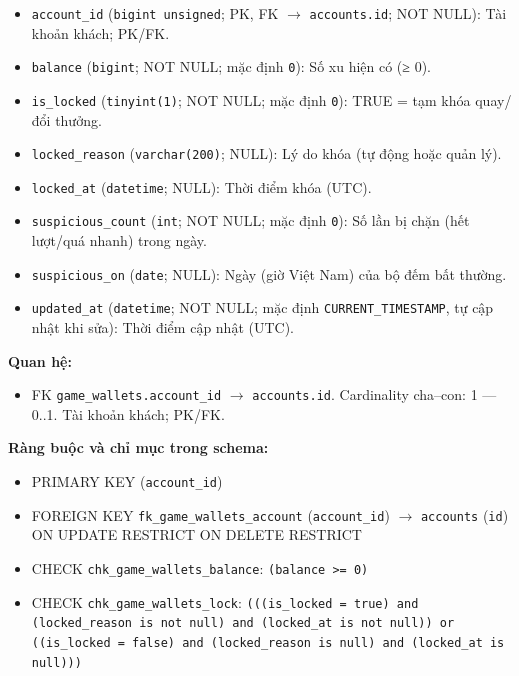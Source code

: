 \begin{itemize}

\item \texttt{account\_id} (\texttt{bigint unsigned}; PK, FK $\rightarrow$ \texttt{accounts.id}; NOT NULL): Tài khoản khách; PK/FK.

\item \texttt{balance} (\texttt{bigint}; NOT NULL; mặc định \texttt{0}): Số xu hiện có (≥ 0).

\item \texttt{is\_locked} (\texttt{tinyint(1)}; NOT NULL; mặc định \texttt{0}): TRUE = tạm khóa quay/đổi thưởng.

\item \texttt{locked\_reason} (\texttt{varchar(200)}; NULL): Lý do khóa (tự động hoặc quản lý).

\item \texttt{locked\_at} (\texttt{datetime}; NULL): Thời điểm khóa (UTC).

\item \texttt{suspicious\_count} (\texttt{int}; NOT NULL; mặc định \texttt{0}): Số lần bị chặn (hết lượt/quá nhanh) trong ngày.

\item \texttt{suspicious\_on} (\texttt{date}; NULL): Ngày (giờ Việt Nam) của bộ đếm bất thường.

\item \texttt{updated\_at} (\texttt{datetime}; NOT NULL; mặc định \texttt{CURRENT\_TIMESTAMP}, tự cập nhật khi sửa): Thời điểm cập nhật (UTC).

\end{itemize}

\textbf{Quan hệ:}

\begin{itemize}

\item FK \texttt{game\_wallets.account\_id} $\rightarrow$ \texttt{accounts.id}. Cardinality cha--con: 1 — 0..1. Tài khoản khách; PK/FK.

\end{itemize}

\textbf{Ràng buộc và chỉ mục trong schema:}

\begin{itemize}

\item PRIMARY KEY (\texttt{account\_id})

\item FOREIGN KEY \texttt{fk\_game\_wallets\_account} (\texttt{account\_id}) $\rightarrow$ \texttt{accounts} (\texttt{id}) ON UPDATE RESTRICT ON DELETE RESTRICT

\item CHECK \texttt{chk\_game\_wallets\_balance}: \texttt{(balance >= 0)}

\item CHECK \texttt{chk\_game\_wallets\_lock}: \texttt{(((is\_locked = true) and (locked\_reason is not null) and (locked\_at is not null)) or ((is\_locked = false) and (locked\_reason is null) and (locked\_at is null)))}

\end{itemize}

